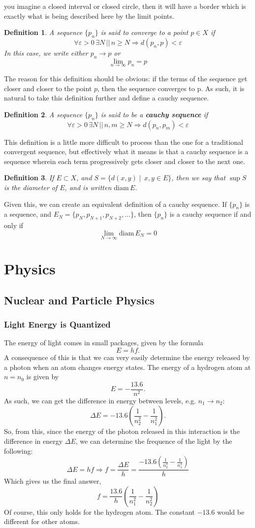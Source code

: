 \documentclass[12pt,a4paper]{report}
\newcommand{\diam}{\mathrm{diam}\,}
\newtheorem{definition}{Definition}
\begin{document}
you imagine a closed interval or closed circle, then it will have a border which
is exactly what is being described here by the limit points.
\begin{definition}
  A sequence $\{ p_n \}$ is said to converge to a point $p\in X$ if \[ \forall
    \varepsilon > 0\,\exists N\,||\, n\geq N\Rightarrow d(p_n,p) < \varepsilon \]
  In this case, we write either $p_n\rightarrow p$ or \[ \lim_{n\rightarrow \infty}p_n=p \]
\end{definition}
The reason for this definition should be obvious: if the terms of the sequence
get closer and closer to the point $p$, then the sequence converges to p. As
such, it is natural to take this definition further and define a cauchy
sequence.
\begin{definition}
  A sequence $\{p_n\}$ is said to be a \textbf{cauchy sequence} if\[\forall
    \varepsilon > 0 \,\exists N \,||\, n,m\geq N\Rightarrow d(p_n,p_m) <
    \varepsilon \]
\end{definition}
This definition is a little more difficult to process than the one for a
traditional convergent sequence, but effectively what it means is that a cauchy
sequence is a sequence wherein each term progressively gets closer and closer to
the next one.
\begin{definition}
  If $E\subset X$, and $S=\{d(x, y)\;|\;\, x,y\in E \}$, then we say that $\sup
  S$ is the diameter of $E$, and is written \(\diam E\).
\end{definition}
Given this, we can create an equivalent definition of a cauchy sequence. If
$\{p_n\}$ is a sequence, and $E_N = \{p_N,p_{N+1},p_{N+2},...\}$, then $\{p_n\}$
is a cauchy sequence if and only if \[ \lim_{N\rightarrow\infty}\diam E_N=0 \]

\chapter{Physics}
\clearpage
\section{Nuclear and Particle Physics}
\subsection{Light Energy is Quantized}
The energy of light comes in small packages, given by the formula \[E = hf.\]
A consequence of this is that we can very easily determine the energy released
by a photon when an atom changes energy states. The energy of a hydrogen atom at
\(n=n_0\) is given by \[E = -\frac{13.6}{n^2}.\] As such, we can get the
difference in energy between levels, e.g. \(n_1\rightarrow n_2\):
\[\Delta E = -13.6\left( \frac{1}{n_2^2}-\frac{1}{n_1^2} \right).\]
So, from this, since the energy of the photon released in this interaction is
the difference in energy \(\Delta E\), we can determine the frequence of the
light by the following:
\[
  \Delta E = hf \Rightarrow f = \frac{\Delta E}{h} = \frac{-13.6\left( \frac{1}{n_2^2}-\frac{1}{n_1^2} \right)}{h}
\]
Which gives us the final answer,
\[
  f = \frac{13.6}{h}\left( \frac{1}{n_1^2}-\frac{1}{n_2^2} \right)
\]
Of course, this only holds for the hydrogen atom. The constant \(-13.6\) would be
different for other atoms.
\end{document}

